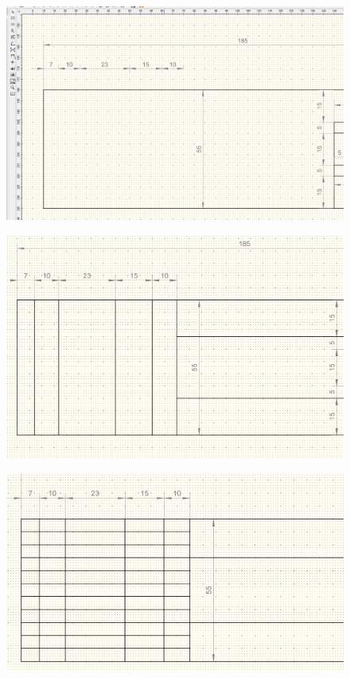 \begin{enumerate}[leftmargin=*]
\begin{figure}[!htb]
    \caption{\label{fig:lab2:sixth_step}}
  \end{figure}
  \begin{figure}[!htb]
    \centering \includegraphics[width=0.7\linewidth]{./images/lab2/seventh_step.png}
    \caption{\label{fig:lab2:seventh_step}}
  \end{figure}
  \begin{figure}[!htb]
    \centering \includegraphics[width=0.7\linewidth]{./images/lab2/eighth_step.png}
    \caption{\label{fig:lab2:eigth_step}}
  \end{figure}
  \begin{figure}[!htb]
    \centering \includegraphics[width=0.7\linewidth]{./images/lab2/nineth_step.png}
    \caption{\label{fig:lab2:nineth_step}}
  \end{figure}
  \FloatBarrier
  

\end{enumerate}
